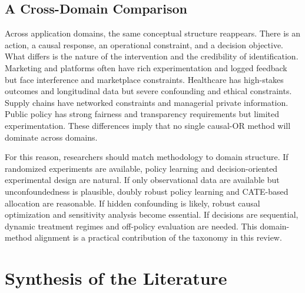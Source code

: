 \documentclass[11pt]{article}
\begin{document}
\subsection{A Cross-Domain Comparison}

Across application domains, the same conceptual structure reappears. There is an action, a causal response, an operational constraint, and a decision objective. What differs is the nature of the intervention and the credibility of identification. Marketing and platforms often have rich experimentation and logged feedback but face interference and marketplace constraints. Healthcare has high-stakes outcomes and longitudinal data but severe confounding and ethical constraints. Supply chains have networked constraints and managerial private information. Public policy has strong fairness and transparency requirements but limited experimentation. These differences imply that no single causal-OR method will dominate across domains.

For this reason, researchers should match methodology to domain structure. If randomized experiments are available, policy learning and decision-oriented experimental design are natural. If only observational data are available but unconfoundedness is plausible, doubly robust policy learning and CATE-based allocation are reasonable. If hidden confounding is likely, robust causal optimization and sensitivity analysis become essential. If decisions are sequential, dynamic treatment regimes and off-policy evaluation are needed. This domain-method alignment is a practical contribution of the taxonomy in this review.

\section{Synthesis of the Literature}
\label{sec:synthesis}
\end{document}
